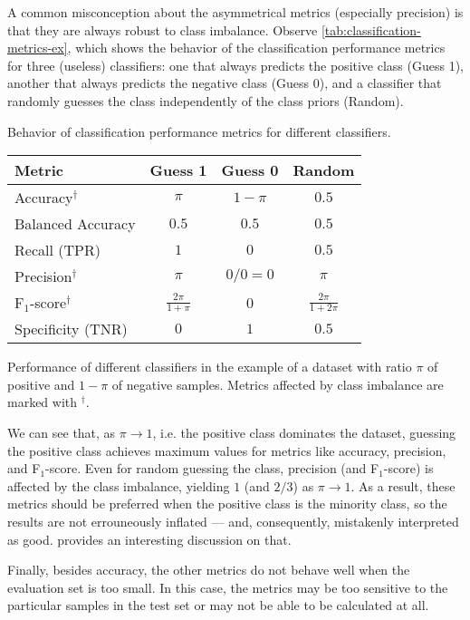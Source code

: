 A common misconception about the asymmetrical metrics (especially precision) is that they
are always robust to class imbalance.  Observe \cref{tab:classification-metrics-ex}, which shows
the behavior of the classification performance metrics for three (useless) classifiers: one
that always predicts the positive class (Guess 1), another that always predicts the
negative class (Guess 0), and a classifier that randomly guesses the class independently
of the class priors (Random).

\begin{tablebox}[label=tab:classification-metrics-ex]{Behavior of classification
  performance metrics for different classifiers.}
  \centering
  \begin{tabular}{l c c c}
    \toprule
    \textbf{Metric} & \textbf{Guess 1} & \textbf{Guess 0} & \textbf{Random} \\
    \midrule
    Accuracy$^\dagger$ & $\pi$ & $1 - \pi$ & $0.5$ \\
    Balanced Accuracy & $0.5$ & $0.5$ & $0.5$ \\
    Recall (TPR) & $1$ & $0$ & $0.5$ \\
    Precision$^\dagger$ & $\pi$ & $0/0 = 0$ & $\pi$ \\
    F$_1$-score$^\dagger$ & $\frac{2 \pi}{1 + \pi}$ & 0 & $\frac{2 \pi}{1 + 2\pi}$ \\
    Specificity (TNR) & $0$ & $1$ & $0.5$ \\
    \bottomrule
  \end{tabular}
  \tcblower
  Performance of different classifiers in the example of a dataset with ratio $\pi$ of
  positive and $1-\pi$ of negative samples.  Metrics affected by class imbalance are
  marked with $^\dagger$.
\end{tablebox}

We can see that, as $\pi \to 1$, i.e. the positive class dominates the dataset, guessing
the positive class achieves maximum values for metrics like accuracy, precision, and
F$_1$-score.  Even for random guessing the class, precision (and F$_1$-score) is affected
by the class imbalance, yielding $1$ (and $2/3$) as $\pi \to 1$.  As a result, these
metrics should be preferred when the positive class is the minority class, so the results
are not errouneously inflated --- and, consequently, mistakenly interpreted as good.
\citeauthor{Williams2021} provides an interesting discussion on
that.

Finally, besides accuracy, the other metrics do not behave well when the evaluation set is
too small.  In this case, the metrics may be too sensitive to the particular samples in
the test set or may not be able to be calculated at all.

